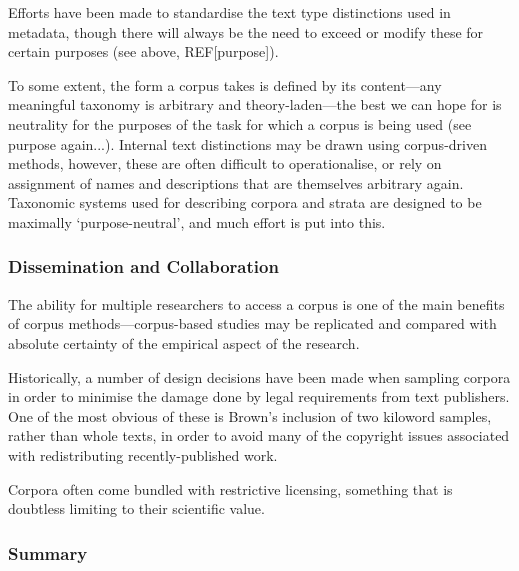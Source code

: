 Efforts have been made %
to standardise the text type distinctions used in metadata, though there will always be the need to exceed or modify these for certain purposes (see above, REF[purpose]).

To some extent, the form a corpus takes is defined by its content---any meaningful taxonomy is arbitrary and theory-laden---the best we can hope for is neutrality for the purposes of the task for which a corpus is being used (see purpose again...).  Internal text distinctions may be drawn using corpus-driven methods, however, these are often difficult to operationalise, or rely on assignment of names and descriptions that are themselves arbitrary again.  Taxonomic systems used for describing corpora and strata are designed to be maximally `purpose-neutral', and much effort is put into this.



\subsubsection{Dissemination and Collaboration}
The ability for multiple researchers to access a corpus is one of the main benefits of corpus methods---corpus-based studies may be replicated and compared with absolute certainty of the empirical aspect of the research.

Historically, a number of design decisions have been made when sampling corpora in order to minimise the damage done by legal requirements from text publishers.  One of the most obvious of these is Brown's inclusion of two kiloword samples, rather than whole texts, in order to avoid many of the copyright issues associated with redistributing recently-published work.

Corpora often come bundled with restrictive licensing, something that is doubtless limiting to their scientific value.



\subsubsection{Summary}



